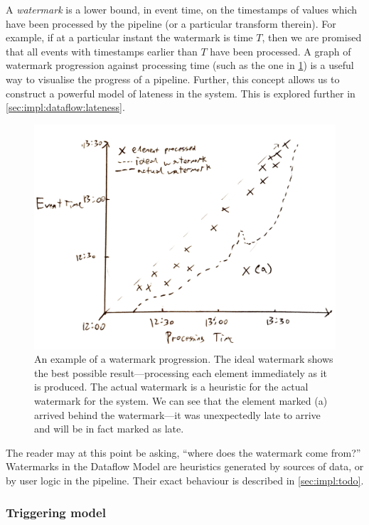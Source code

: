 A \emph{watermark} is a lower bound, in event time, on the timestamps of values which have been processed by the pipeline (or a particular transform therein).
For example, if at a particular instant the watermark is time $T$, then we are promised that all events with timestamps earlier than $T$ have been processed.
A graph of watermark progression against processing time (such as the one in \cref{fig:prep:watermark-progression}) is a useful way to visualise the progress of a pipeline.
Further, this concept allows us to construct a powerful model of lateness in the system.
This is explored further in \cref{sec:impl:dataflow:lateness}.

\begin{figure}[h]
	\includegraphics[width=\textwidth]{images/temp/watermark-progression-example}
	\caption{An example of a watermark progression. The ideal watermark shows the best possible result---processing each element immediately as it is produced. The actual watermark is a heuristic for the actual watermark for the system. We can see that the element marked (a) arrived behind the watermark---it was unexpectedly late to arrive and will be in fact marked as late.}
	\label{fig:prep:watermark-progression}
\end{figure}

The reader may at this point be asking, ``where does the watermark come from?''
Watermarks in the Dataflow Model are heuristics generated by sources of data, or by user logic in the pipeline.
Their exact behaviour is described in \cref{sec:impl:todo}.

\subsubsection{Triggering model}

